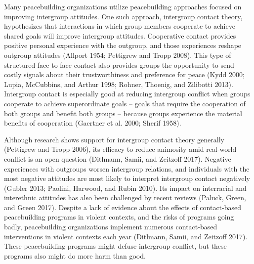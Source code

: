 \documentclass[11pt]{article}
\begin{document}
Many peacebuilding organizations utilize peacebuilding approaches
focused on improving intergroup attitudes. One such approach, intergroup
contact theory, hypothesizes that interactions in which group members
cooperate to achieve shared goals will improve intergroup attitudes.
Cooperative contact provides positive personal experience with the
outgroup, and those experiences reshape outgroup attitudes (Allport
1954; Pettigrew and Tropp 2008). This type of structured face-to-face
contact also provides groups the opportunity to send costly signals
about their trustworthiness and preference for peace (Kydd 2000; Lupia,
McCubbins, and Arthur 1998; Rohner, Thoenig, and Zilibotti 2013).
Intergroup contact is especially good at reducing intergroup conflict
when groups cooperate to achieve superordinate goals -- goals that
require the cooperation of both groups and benefit both groups --
because groups experience the material benefits of cooperation (Gaertner
et al. 2000; Sherif 1958).

Although research shows support for intergroup contact theory generally
(Pettigrew and Tropp 2006), its efficacy to reduce animosity amid
real-world conflict is an open question (Ditlmann, Samii, and Zeitzoff
2017). Negative experiences with outgroups worsen intergroup relations,
and individuals with the most negative attitudes are most likely to
interpret intergroup contact negatively (Gubler 2013; Paolini, Harwood,
and Rubin 2010). Its impact on interracial and interethnic attitudes has
also been challenged by recent reviews (Paluck, Green, and Green 2017).
Despite a lack of evidence about the effects of contact-based
peacebuilding programs in violent contexts, and the risks of programs
going badly, peacebuilding organizations implement numerous
contact-based interventions in violent contexts each year (Ditlmann,
Samii, and Zeitzoff 2017). These peacebuilding programs might defuse
intergroup conflict, but these programs also might do more harm than
good.
\end{document}
